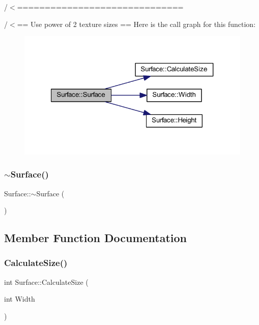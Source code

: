 /$<$============================== 

/$<$== Use power of 2 texture sizes == Here is the call graph for this function\+:\nopagebreak
\begin{figure}[H]
\begin{center}
\leavevmode
\includegraphics[width=321pt]{class_surface_a323ba9165c8635e84eb0c490fe88d846_cgraph}
\end{center}
\end{figure}
\mbox{\label{class_surface_a89de75c95cb550d432f3ea4ed1429db0}} 
\subsubsection{$\sim$\+Surface()}
{\footnotesize\ttfamily Surface\+::$\sim$\+Surface (\begin{DoxyParamCaption}{ }\end{DoxyParamCaption})}



\subsection{Member Function Documentation}
\mbox{\label{class_surface_aeb8a8540f415a4d29c440667e8532e91}} 
\subsubsection{Calculate\+Size()}
{\footnotesize\ttfamily int Surface\+::\+Calculate\+Size (\begin{DoxyParamCaption}\item[{int}]{Width }\end{DoxyParamCaption})}

